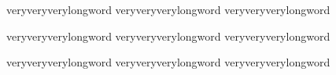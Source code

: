 \documentclass[11pt,a4paper]{article}
\begin{document}
\noindent veryveryverylongword veryveryverylongword veryveryverylongword

\noindent veryveryverylongword veryveryverylongword veryveryverylongword

\noindent veryveryverylongword veryveryverylongword veryvery\allowbreak verylongword
\end{document}
